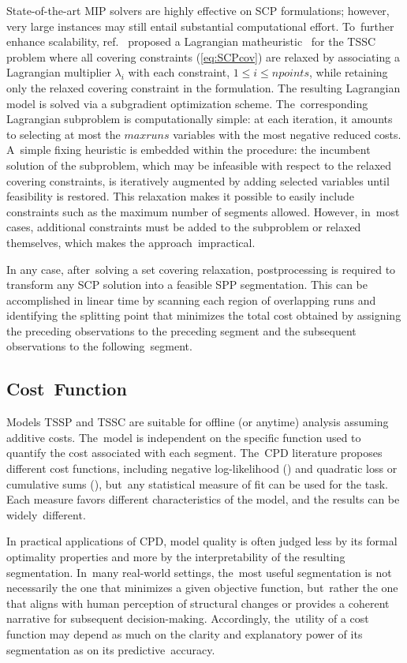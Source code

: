 \documentclass[mathematics,article,accept,pdftex,moreauthors]{Definitions/mdpi}
\begin{document}
State-of-the-art MIP solvers are highly effective on SCP formulations; however, very large instances may still entail substantial computational effort. To~further enhance scalability, ref.~\cite{M24} proposed a Lagrangian matheuristic~\cite{the_book} for the TSSC problem where  all covering constraints (\ref{eq:SCPcov}) are relaxed by associating a Lagrangian multiplier $\lambda_i$ with each constraint, $1 \leq i \leq npoints$, while retaining only the relaxed covering constraint in the formulation. 
The resulting Lagrangian model is solved via a subgradient optimization scheme. The~corresponding Lagrangian subproblem is computationally simple: at each iteration, it amounts to selecting at most the $maxruns$ variables with the most negative reduced costs. A~simple fixing heuristic is embedded within the procedure: the incumbent solution of the subproblem, which may be infeasible with respect to the relaxed covering constraints, is iteratively augmented by adding selected variables until feasibility is restored. This relaxation makes it possible to easily include constraints such as the maximum number of segments allowed. However, in~most cases, additional constraints must be added to the subproblem or relaxed themselves, which makes the approach~impractical.

In any case, after~solving a set covering relaxation, postprocessing is required to transform any SCP solution into a feasible SPP segmentation. This can be accomplished in linear time by scanning each region of overlapping runs and identifying the splitting point that minimizes the total cost obtained by assigning the preceding observations to the preceding segment and the subsequent observations to the following~segment.

\subsection{Cost~Function}	\label{subsec:costfunc}

Models TSSP and TSSC are suitable for offline (or anytime) analysis assuming additive costs. The~model is independent on the specific function used to quantify the cost associated with each segment. The~CPD literature proposes different cost functions, including negative log-likelihood (\cite{H93}) and quadratic loss or cumulative sums (\cite{IT94}), but~any statistical measure of fit can be used for the task. Each measure favors different characteristics of the model, and the results can be widely~different.

In practical applications of CPD, model quality is often judged less by its formal optimality properties and more by the interpretability of the resulting segmentation. In~many real-world settings, the~most useful segmentation is not necessarily the one that minimizes a given objective function, but~rather the one that aligns with human perception of structural changes or provides a coherent narrative for subsequent decision-making. Accordingly, the~utility of a cost function may depend as much on the clarity and explanatory power of its segmentation as on its predictive~accuracy.
\end{document}
